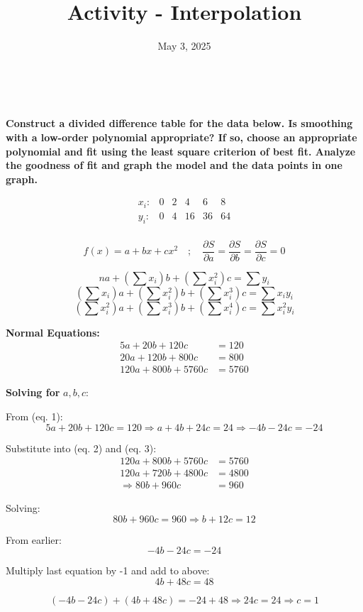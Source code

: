 \documentclass[legalpaper,11pt,extrafontsizes,oneside,openany]{memoir}
\title{Activity - Interpolation}
\date{May 3, 2025}
\makeatletter
\def\maketitle{
    \begin{center}
        \LARGE \textbf{\@title} \\[0.5ex]
        \large \@date
    \end{center}
}
\makeatother
\begin{document}
\maketitle

\textbf{Construct a divided difference table for the data below. Is smoothing with a low-order polynomial appropriate? If so, choose an appropriate polynomial and fit using the least square criterion of best fit. Analyze the goodness of fit and graph the model and the data points in one graph.}

\[
\begin{array}{ccccccc}
x_i: & 0 & 2 & 4 & 6 & 8 \\
y_i: & 0 & 4 & 16 & 36 & 64 \\
\end{array}
\]

\[
f(x) = a + bx + cx^2 \quad ; \quad \frac{\partial S}{\partial a} = \frac{\partial S}{\partial b} = \frac{\partial S}{\partial c} = 0
\]

\[
na + \left(\sum x_i\right) b + \left(\sum x_i^2\right) c = \sum y_i
\]
\[
\left(\sum x_i\right) a + \left(\sum x_i^2\right) b + \left(\sum x_i^3\right) c = \sum x_i y_i
\]
\[
\left(\sum x_i^2\right) a + \left(\sum x_i^3\right) b + \left(\sum x_i^4\right) c = \sum x_i^2 y_i
\]

\textbf{Normal Equations:}
\begin{align}
5a + 20b + 120c &= 120 \\
20a + 120b + 800c &= 800 \\
120a + 800b + 5760c &= 5760
\end{align}

\textbf{Solving for } $a, b, c$:

From (eq. 1):
\[
5a + 20b + 120c = 120 \Rightarrow a + 4b + 24c = 24 \Rightarrow -4b - 24c = -24
\]

Substitute into (eq. 2) and (eq. 3):
\begin{align}
120a + 800b + 5760c &= 5760 \\
120a + 720b + 4800c &= 4800 \\
\Rightarrow 80b + 960c &= 960
\end{align}

Solving:
\[
80b + 960c = 960 \Rightarrow b + 12c = 12
\]

From earlier:
\[
-4b - 24c = -24
\]

Multiply last equation by -1 and add to above:
\[
4b + 48c = 48
\]

\[
(-4b - 24c) + (4b + 48c) = -24 + 48 \Rightarrow 24c = 24 \Rightarrow c = 1
\]
\end{document}
